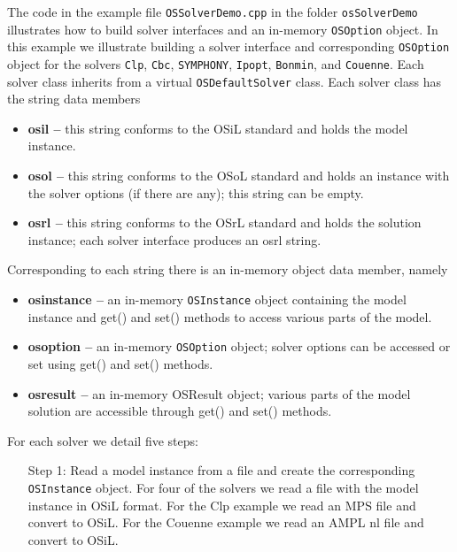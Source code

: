 \documentclass[11pt]{article}
\renewcommand{\_}{{\char"5F}}
\renewcommand{\{}{{\char"7B}}
\renewcommand{\}}{{\char"7D}}
\renewcommand{\^}{{\char"0D}}
\renewcommand{\'}{{\char"0D}}
\begin{document}
\begin{enumerate}[Step 1:]
The code in the  example file {\tt OSSolverDemo.cpp} in the folder {\tt osSolverDemo}  illustrates  how to build solver interfaces and  an in-memory {\tt OSOption} object. In this example we  illustrate building a solver interface and corresponding {\tt OSOption} object for the solvers {\tt Clp}, {\tt Cbc}, {\tt SYMPHONY}, {\tt Ipopt},   {\tt Bonmin}, and {\tt Couenne}.   Each solver class inherits from a virtual {\tt OSDefaultSolver} class. Each solver class has the string data members

\begin{itemize}
\item {\bf osil --} this string conforms to the OSiL standard and holds the model instance.

\item {\bf osol --} this string conforms to the OSoL standard and holds an instance with the 
solver options (if there are any); this string can be empty.

\item {\bf osrl --} this string conforms to the OSrL standard and holds the solution instance; 
each solver interface produces an osrl string.
\end{itemize}

Corresponding to each string there is an in-memory object data member, namely

\begin{itemize}
\item {\bf osinstance --}  an in-memory {\tt OSInstance} object containing the model instance
and get() and set() methods to access various parts of the model.


\item {\bf osoption --} an in-memory {\tt OSOption} object; solver options can be accessed or 
set using get() and set() methods.


\item {\bf osresult --}  an in-memory OSResult object; various parts of the model solution  
are accessible through get() and set() methods.
\end{itemize}


For each solver we detail five steps:

\begin{itemize}
\item[Step 1:]  Read a model instance from a file  and create the corresponding {\tt OSInstance} object.
For four of the solvers we read a file with the model instance in OSiL format. For the Clp example 
we read an MPS file and convert to OSiL. For the Couenne example we read an AMPL nl file and convert 
to OSiL.


\end{itemize}
\end{enumerate}
\end{document}
